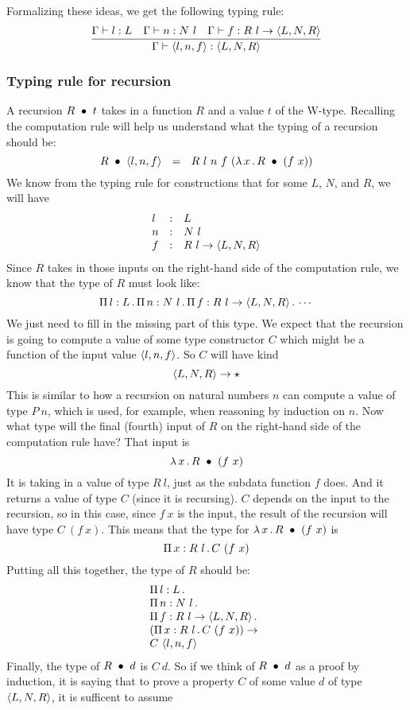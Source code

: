 \documentclass{article}
\begin{document}
Formalizing these ideas, we get the following typing rule:
\[
\infer{\Gamma \vdash \ctor{l}{n}{f} : \w{L}{N}{R}}
      {\Gamma \vdash l : L & \Gamma \vdash n : N\ l & \Gamma \vdash f : R\ l \to \w{L}{N}{R}}
      \]
      
\subsubsection{Typing rule for recursion}

A recursion $R\ \bullet\ t$ takes in a function $R$ and a value $t$ of the W-type.
Recalling the computation rule will help us understand what the typing of a recursion
should be:
\[
\wrec{R}{\ctor{l}{n}{f}} \ \ = \ \ R\ l\ n\ f\ (\lam{x}{\wrec{R}{(f\ x)}})
\]
\noindent We know from the typing rule for constructions that for some $L$, $N$, and $R$, we will have
\[
\begin{array}{lll}
  l & : & L \\
  n & : & N\ l \\
  f & : & R\ l \to \langle L , N , R \rangle
\end{array}
\]
\noindent Since $R$ takes in those inputs on the right-hand side of the computation rule,
we know that the type of $R$ must look like:
\[
\Pia{l}{L}{\Pia{n}{N\ l}{\Pia{f}{R\ l \to \w{L}{N}{R}}{\cdots}}}
\]
\noindent We just need to fill in the missing part of this type.  We expect that
the recursion is going to compute a value of some type constructor $C$ which might
be a function of the input value $\langle l , n, f \rangle$.  So $C$ will have kind
\[
\langle L , N , R \rangle \to \star
\]
\noindent This is similar to how a recursion on natural numbers $n$ can compute a value of type $P\ n$,
which is used, for example, when reasoning by induction on $n$.  Now what type will the final (fourth)
input of $R$ on the right-hand side of the computation rule have?  That input is
\[
\lambda\, x\, .\, R\ \bullet\ (f\ x)
\]
\noindent It is taking in a value of type $R\ l$, just as the subdata function $f$ does.  And it returns
a value of type $C$ (since it is recursing).  $C$ depends on the input to the recursion, so in this case,
since $f\ x$ is the input, the result of the recursion will have type $C\ (f\ x)$.  This means that the
type for $\lambda\, x\, .\, R\ \bullet\ (f\ x)$ is
\[
\Pi\, x: R\ l\, .\, C\ (f\ x)
\]
\noindent Putting all this together, the type of $R$ should be:
\[
\begin{array}{l}
  \Pi\, l: L\, .\, \ \\
  \Pi\, n: N\ l\, .\, \ \\
  \Pi\, f: R\ l \to \langle L , N , R \rangle\, .\, \  \\
  (\Pi\, x: R\ l\, .\, C\ (f\ x)) \to \\
  C\ \langle l , n, f \rangle
  \end{array}
\]
\noindent Finally, the type of $R\ \bullet\ d$ is $C\ d$.  So if we think of $R\ \bullet\ d$
as a proof by induction, it is saying that to prove a property $C$ of some value $d$ of
type $\langle L , N , R \rangle$, it is sufficent to assume
\end{document}
